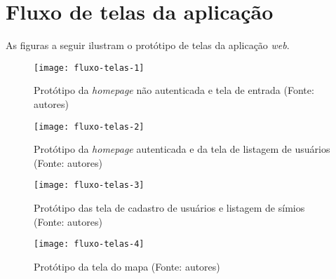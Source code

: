 \chapter{Fluxo de telas da aplicação}

As figuras a seguir ilustram o protótipo de telas da aplicação \emph{web}.

\begin{figure}[ht]
  \centering
    \texttt{[image: fluxo-telas-1]}
  \caption{Protótipo da \emph{homepage} não autenticada e tela de entrada (Fonte: autores)}
\end{figure}

\begin{figure}[ht]
  \centering
    \texttt{[image: fluxo-telas-2]}
  \caption{Protótipo da \emph{homepage} autenticada e da tela de listagem de usuários (Fonte: autores)}
\end{figure}

\begin{figure}[ht]
  \centering
    \texttt{[image: fluxo-telas-3]}
  \caption{Protótipo das tela de cadastro de usuários e listagem de símios (Fonte: autores)}
\end{figure}

\begin{figure}[ht]
  \centering
    \texttt{[image: fluxo-telas-4]}
  \caption{Protótipo da tela do mapa (Fonte: autores)}
\end{figure}

